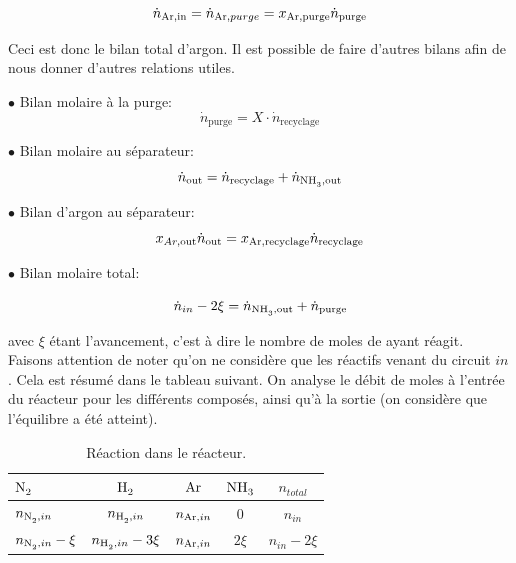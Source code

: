 \documentclass[a4paper, oneside, 12pt]{article}
\begin{document}
\begin{equation}
\dot{n}_{\ce{Ar},\text{in}}=\dot{n}_{\ce{Ar},purge}=x_{\ce{Ar},\text{purge}} \dot{n}_{\text{purge}}
\end{equation}

Ceci est donc le bilan total d'argon. 
Il est possible de faire d'autres bilans afin de nous donner d'autres relations utiles.

$\bullet$ Bilan molaire à la purge:
\begin{equation}
\dot{n}_{\text{purge}} = X \cdot \dot{n}_{\text{recyclage}}
\label{eq:bilan_mol_purge}
\end{equation}

$\bullet$ Bilan molaire au séparateur:
\begin{equation}
\dot{n}_{\text{out}}=\dot{n}_{\text{recyclage}}+\dot{n}_{\ce{NH3},\text{out}}
\label{eq:bilan_mol_sep}
\end{equation}

$\bullet$ Bilan d'argon au séparateur:
\begin{equation}
x_{Ar,\text{out}} \dot{n}_{\text{out}}=x_{\ce{Ar},\text{recyclage}} \dot{n}_{\text{recyclage}}
\end{equation}

$\bullet$ Bilan molaire total:

\begin{equation}
	\dot{n}_{in} - 2\xi=\dot{n}_{\ce{NH3},\text{out}} + \dot{n}_{\text{purge}}
	\label{eq:bilan_mol_tot}
\end{equation}

avec $\xi$ étant l'avancement, c'est à dire le nombre de moles de  ayant réagit. 
Faisons attention de noter qu'on ne considère que les réactifs venant du circuit $in$. 
Cela est résumé dans le tableau suivant. 
On analyse le débit de moles à l'entrée du réacteur pour les différents composés, 
ainsi qu'à la sortie (on considère que l'équilibre a été atteint).

\begin{table}[h!]
	\centering
	\begin{tabular}{l|c|c|c|c}
		$\ce{N2}$ & $\ce{H2}$ & $\ce{Ar}$ & $\ce{NH3}$ & $n_{total}$ \\
		\hline
		$n_{\ce{N2},in}$ & $n_{\ce{H2},in}$ & $n_{\ce{Ar},in}$ & $0$  & $n_{in}$\\
		$n_{\ce{N2},in}-\xi$ & $n_{\ce{H2},in}-3\xi$ & $n_{\ce{Ar},in}$ & $2\xi$  & $n_{in}-2\xi$\\
	\end{tabular}
	\caption{Réaction dans le réacteur.}
	\label{tab:reaction1_primaire}
\end{table}
\end{document}
